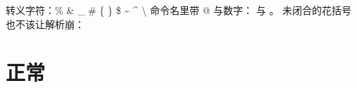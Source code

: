 \documentclass{article}
\begin{document}
转义字符：\%  \&  \_  \#  \{  \}  \$  \~{}  \^{}  \textbackslash{}
命令名里带 @ 与数字： 与 。
未闭合的花括号也不该让解析崩：\section{正常}
\end{document}
